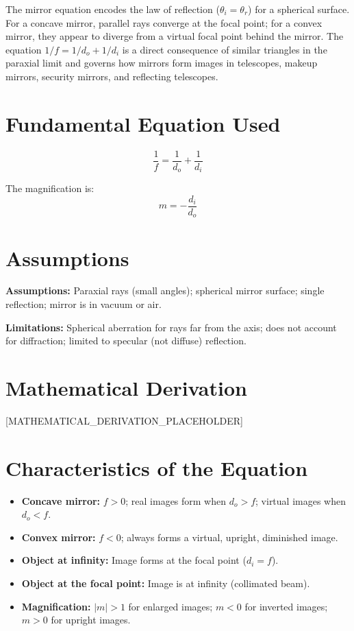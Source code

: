 \documentclass[11pt,openright]{book}
\begin{document}
The mirror equation encodes the law of reflection ($\theta_{i} = \theta_{r}$) for a spherical surface. For a concave mirror, parallel rays converge at the focal point; for a convex mirror, they appear to diverge from a virtual focal point behind the mirror. The equation $1/f = 1/d_{o} + 1/d_{i}$ is a direct consequence of similar triangles in the paraxial limit and governs how mirrors form images in telescopes, makeup mirrors, security mirrors, and reflecting telescopes.
\section*{Fundamental Equation Used}

\begin{equation}
\boxed{\; \frac{1}{f} = \frac{1}{d_{o}} + \frac{1}{d_{i}}\;}
\label{eq:mirror}
\end{equation}

The magnification is:
\begin{equation}
m = -\frac{d_{i}}{d_{o}}
\label{eq:magnification}
\end{equation}
\section*{Assumptions}

\textbf{Assumptions:} Paraxial rays (small angles); spherical mirror surface; single reflection; mirror is in vacuum or air.


\textbf{Limitations:} Spherical aberration for rays far from the axis; does not account for diffraction; limited to specular (not diffuse) reflection.


\section*{Mathematical Derivation}

[MATHEMATICAL_DERIVATION_PLACEHOLDER]

\section*{Characteristics of the Equation}

\begin{itemize}
  \item \textbf{Concave mirror:} $f > 0$; real images form when $d_{o} > f$; virtual images when $d_{o} < f$.
  \item \textbf{Convex mirror:} $f < 0$; always forms a virtual, upright, diminished image.
  \item \textbf{Object at infinity:} Image forms at the focal point ($d_{i} = f$).
  \item \textbf{Object at the focal point:} Image is at infinity (collimated beam).
  \item \textbf{Magnification:} $|m| > 1$ for enlarged images; $m < 0$ for inverted images; $m > 0$ for upright images.
\end{itemize}
\end{document}
